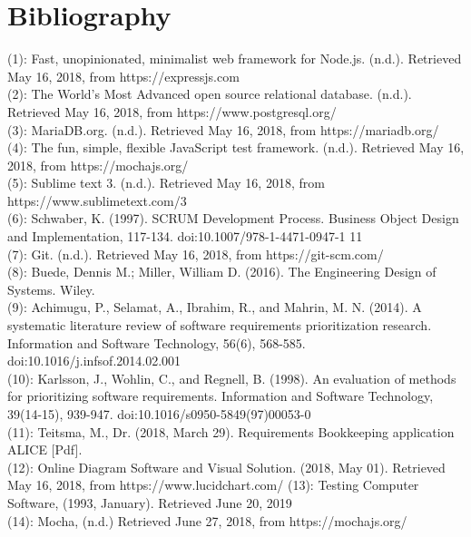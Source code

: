 \documentclass[paper=a4, fontsize=11pt,twoside]{scrartcl}	%
\begin{document}
\section{Bibliography}
(1): Fast, unopinionated, minimalist web framework for Node.js. (n.d.). Retrieved May 16, 2018, from https://expressjs.com \\ 
(2): The World's Most Advanced open source relational database. (n.d.). Retrieved May 16, 2018, from https://www.postgresql.org/ \\
(3): MariaDB.org. (n.d.). Retrieved May 16, 2018, from https://mariadb.org/  \\
(4): The fun, simple, flexible JavaScript test framework. (n.d.). Retrieved May 16, 2018, from https://mochajs.org/ \\
(5): Sublime text 3. (n.d.). Retrieved May 16, 2018, from https://www.sublimetext.com/3 \\
(6): Schwaber, K. (1997). SCRUM Development Process. Business Object Design and Implementation, 117-134. doi:10.1007/978-1-4471-0947-1 11\\ 
(7): Git. (n.d.). Retrieved May 16, 2018, from https://git-scm.com/ \\
(8): Buede, Dennis M.; Miller, William D. (2016). The Engineering Design of Systems. Wiley. \\
(9): Achimugu, P., Selamat, A., Ibrahim, R., and Mahrin, M. N. (2014). A systematic literature review of software requirements prioritization research. Information and Software Technology, 56(6), 568-585. doi:10.1016/j.infsof.2014.02.001 \\
(10): Karlsson, J., Wohlin, C., and Regnell, B. (1998). An evaluation of methods for prioritizing software requirements. Information and Software Technology, 39(14-15), 939-947. doi:10.1016/s0950-5849(97)00053-0 \\
(11): Teitsma, M., Dr. (2018, March 29). Requirements Bookkeeping application ALICE [Pdf]. \\
(12): Online Diagram Software and Visual Solution. (2018, May 01). Retrieved May 16, 2018, from https://www.lucidchart.com/
(13): Testing Computer Software, (1993, January). Retrieved June 20, 2019 \\
(14): Mocha, (n.d.) Retrieved June 27, 2018, from https://mochajs.org/ 








 
\newpage
\end{document}

